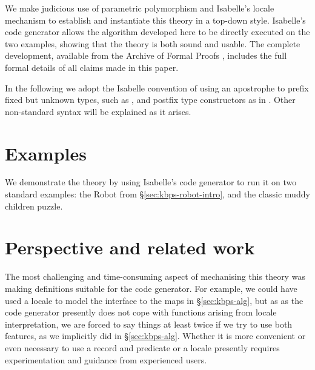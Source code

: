 \documentclass{article}
\newcommand{\isafun}[1]{{\sf #1}}
\renewcommand{\isacharprime}{\ensuremath{\mathit{\mskip2mu'\mskip-2mu}}}
\begin{document}
We make judicious use of parametric polymorphism and Isabelle's locale
mechanism \cite{DBLP:conf/mkm/Ballarin06} to establish and instantiate
this theory in a top-down style. Isabelle's code generator
\cite{Haftmann-Nipkow:2010:code} allows the algorithm developed here
to be directly executed on the two examples, showing that the theory
is both sound and usable. The complete development, available from the
Archive of Formal Proofs \cite{Gammie:2011}, includes the full formal
details of all claims made in this paper.

In the following we adopt the Isabelle convention of using an
apostrophe to prefix fixed but unknown types, such as
\isa{{\isacharprime}a}, and postfix type constructors
as in \isa{{\isacharprime}a\ \isafun{list}}. Other
non-standard syntax will be explained as it arises.



















\section{Examples}
\label{sec:kbps-theory-examples}

We demonstrate the theory by using Isabelle's code generator to run it
on two standard examples: the Robot from \S\ref{sec:kbps-robot-intro},
and the classic muddy children puzzle.




\section{Perspective and related work}
\label{sec:perspective}
\label{sec:kbps-alg-reduction}

The most challenging and time-consuming aspect of mechanising this
theory was making definitions suitable for the code generator. For
example, we could have used a locale to model the interface to the
maps in \S\ref{sec:kbps-alg}, but as as the code generator presently
does not cope with functions arising from locale interpretation, we
are forced to say things at least twice if we try to use both
features, as we implicitly did in \S\ref{sec:kbps-alg}. Whether it is
more convenient or even necessary to use a record and predicate or a
locale presently requires experimentation and guidance from
experienced users.
\end{document}
